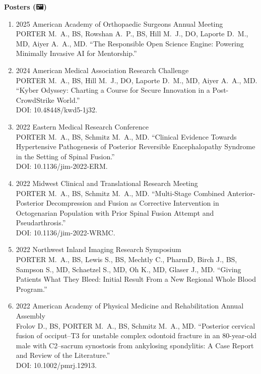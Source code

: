 \documentclass[9pt,a4paper]{article}
\newcommand{\emojiPoster}{{\emoji 🖼}}
\begin{document}
\vspace{0.4em}
\textbf{Posters (\emojiPoster)}
\begin{enumerate}[leftmargin=*,resume]
  \item 2025 American Academy of Orthopaedic Surgeons Annual Meeting\\
  PORTER M.\ A., BS, Rowshan A.\ P., BS, Hill M.\ J., DO, Laporte D.\ M., MD, Aiyer A.\ A., MD. ``The Responsible Open Science Engine: Powering Minimally Invasive AI for Mentorship.''

  \item 2024 American Medical Association Research Challenge\\
  PORTER M.\ A., BS, Hill M.\ J., DO, Laporte D.\ M., MD, Aiyer A.\ A., MD. ``Kyber Odyssey: Charting a Course for Secure Innovation in a Post-CrowdStrike World.''\\
  DOI: 10.48448/kwd5-1j32.

  \item 2022 Eastern Medical Research Conference\\
  PORTER M.\ A., BS, Schmitz M.\ A., MD. ``Clinical Evidence Towards Hypertensive Pathogenesis of Posterior Reversible Encephalopathy Syndrome in the Setting of Spinal Fusion.''\\
  DOI: 10.1136/jim-2022-ERM.

  \item 2022 Midwest Clinical and Translational Research Meeting\\
  PORTER M.\ A., BS, Schmitz M.\ A., MD. ``Multi-Stage Combined Anterior-Posterior Decompression and Fusion as Corrective Intervention in Octogenarian Population with Prior Spinal Fusion Attempt and Pseudarthrosis.''\\
  DOI: 10.1136/jim-2022-WRMC.

  \item 2022 Northwest Inland Imaging Research Symposium\\
  PORTER M.\ A., BS, Lewis S., BS, Mechtly C., PharmD, Birch J., BS, Sampson S., MD, Schaetzel S., MD, Oh K., MD, Glaser J., MD. ``Giving Patients What They Bleed: Initial Result From a New Regional Whole Blood Program.''

  \item 2022 American Academy of Physical Medicine and Rehabilitation Annual Assembly\\
  Frolov D., BS, PORTER M.\ A., BS, Schmitz M.\ A., MD. ``Posterior cervical fusion of occiput--T3 for unstable complex odontoid fracture in an 80-year-old male with C2--sacrum synostosis from ankylosing spondylitis: A Case Report and Review of the Literature.''\\
  DOI: 10.1002/pmrj.12913.
\end{enumerate}
\end{document}
